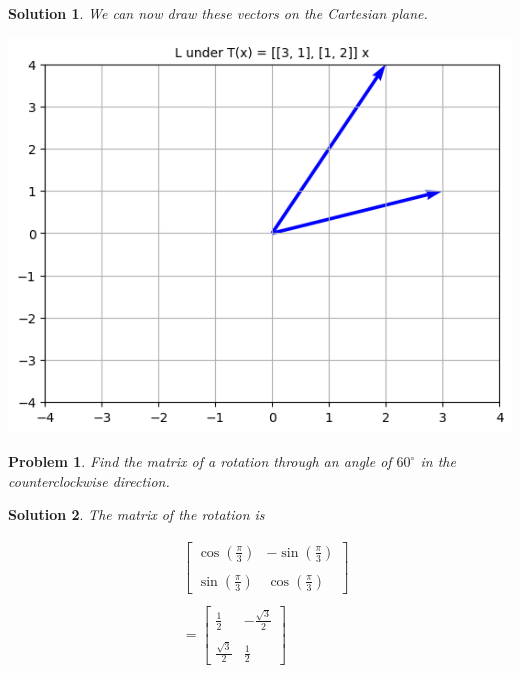 \documentclass{article}
\newtheorem{problem}{Problem}
\newtheorem*{solution}{Solution}
\begin{document}
\begin{solution}
We can now draw these vectors on the Cartesian plane.

\includegraphics[scale=0.5, center]{L3112} 

\end{solution}

\begin{problem}
Find the matrix of a rotation through an angle of $60^\circ$ in the counterclockwise direction.
\end{problem}

\begin{solution}
The matrix of the rotation is

\begin{align*}
& \begin{bmatrix}
\cos(\frac{\pi}{3}) & -\sin(\frac{\pi}{3}) \\ \\
\sin(\frac{\pi}{3}) & \cos(\frac{\pi}{3})
\end{bmatrix} \\ \\
&= \begin{bmatrix}
\frac{1}{2} & -\frac{\sqrt{3}}{2} \\ \\
\frac{\sqrt{3}}{2}  & \frac{1}{2}
\end{bmatrix}
\end{align*}

\end{solution}
\end{document}
